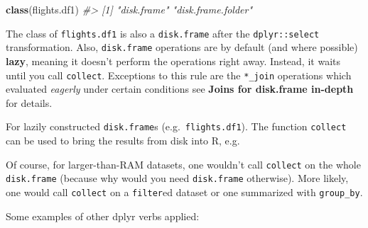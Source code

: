 \documentclass[]{book}
\newenvironment{Shaded}{\begin{snugshade}}{\end{snugshade}}
\newcommand{\CommentTok}[1]{\textcolor[rgb]{0.56,0.35,0.01}{\textit{#1}}}
\newcommand{\KeywordTok}[1]{\textcolor[rgb]{0.13,0.29,0.53}{\textbf{#1}}}
\newcommand{\NormalTok}[1]{#1}
\newcommand{\OperatorTok}[1]{\textcolor[rgb]{0.81,0.36,0.00}{\textbf{#1}}}
\newcommand{\StringTok}[1]{\textcolor[rgb]{0.31,0.60,0.02}{#1}}
\begin{document}
\begin{Shaded}
\begin{Highlighting}[]
\KeywordTok{class}\NormalTok{(flights.df1)}
\CommentTok{#> [1] "disk.frame"        "disk.frame.folder"}
\end{Highlighting}
\end{Shaded}

The class of \texttt{flights.df1} is also a \texttt{disk.frame} after the \texttt{dplyr::select} transformation. Also, \texttt{disk.frame} operations are by default (and where possible) \textbf{lazy}, meaning it doesn't perform the operations right away. Instead, it waits until you call \texttt{collect}. Exceptions to this rule are the \texttt{*\_join} operations which evaluated \emph{eagerly} under certain conditions see \textbf{Joins for disk.frame in-depth} for details.

For lazily constructed \texttt{disk.frame}s (e.g.~\texttt{flights.df1}). The function \texttt{collect} can be used to bring the results from disk into R, e.g.

\begin{Shaded}
\end{Shaded}

Of course, for larger-than-RAM datasets, one wouldn't call \texttt{collect} on the whole \texttt{disk.frame} (because why would you need \texttt{disk.frame} otherwise). More likely, one would call \texttt{collect} on a \texttt{filter}ed dataset or one summarized with \texttt{group\_by}.

Some examples of other dplyr verbs applied:
\end{document}
